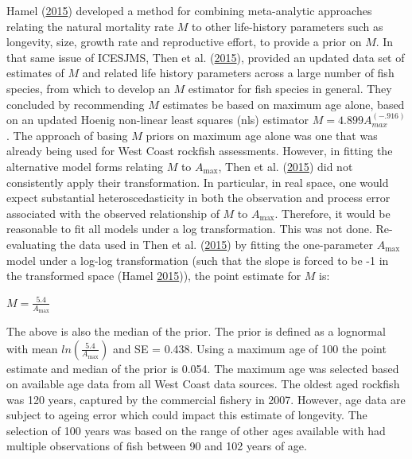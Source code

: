 \documentclass[12pt,]{article}
\begin{document}
Hamel (\protect\hyperlink{ref-hamel_method_2015}{2015}) developed a
method for combining meta-analytic approaches relating the natural
mortality rate \(M\) to other life-history parameters such as longevity,
size, growth rate and reproductive effort, to provide a prior on \(M\).
In that same issue of ICESJMS, Then et al.
(\protect\hyperlink{ref-then_evaluating_2015}{2015}), provided an
updated data set of estimates of \(M\) and related life history
parameters across a large number of fish species, from which to develop
an \(M\) estimator for fish species in general. They concluded by
recommending \(M\) estimates be based on maximum age alone, based on an
updated Hoenig non-linear least squares (nls) estimator
\(M=4.899A_{max}^(-.916)\). The approach of basing \(M\) priors on
maximum age alone was one that was already being used for West Coast
rockfish assessments. However, in fitting the alternative model forms
relating \(M\) to \(A_{\text{max}}\), Then et al.
(\protect\hyperlink{ref-then_evaluating_2015}{2015}) did not
consistently apply their transformation. In particular, in real space,
one would expect substantial heteroscedasticity in both the observation
and process error associated with the observed relationship of \(M\) to
\(A_{\text{max}}\). Therefore, it would be reasonable to fit all models
under a log transformation. This was not done. Re-evaluating the data
used in Then et al. (\protect\hyperlink{ref-then_evaluating_2015}{2015})
by fitting the one-parameter \(A_{\text{max}}\) model under a log-log
transformation (such that the slope is forced to be -1 in the
transformed space (Hamel
\protect\hyperlink{ref-hamel_method_2015}{2015})), the point estimate
for \(M\) is:

\begin{centering}

$M=\frac{5.4}{A_{\text{max}}}$

\end{centering}

The above is also the median of the prior. The prior is defined as a
lognormal with mean \(ln(\frac{5.4}{A_{\text{max}}})\) and SE = 0.438.
Using a maximum age of 100 the point estimate and median of the prior is
0.054. The maximum age was selected based on available age data from all
West Coast data sources. The oldest aged rockfish was 120 years,
captured by the commercial fishery in 2007. However, age data are
subject to ageing error which could impact this estimate of longevity.
The selection of 100 years was based on the range of other ages
available with had multiple observations of fish between 90 and 102
years of age.
\end{document}
